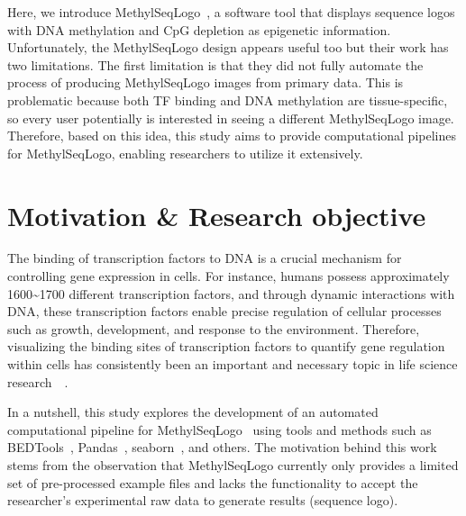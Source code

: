 \documentclass{PHlab-thesis}
\begin{document}
Here, we introduce MethylSeqLogo~\cite{Hsu2022.11.05.515271}, a software tool that displays sequence logos with DNA methylation and CpG depletion as epigenetic information. Unfortunately, the MethylSeqLogo design appears useful too but their work has two limitations. The first limitation is that they did not fully automate the process of producing MethylSeqLogo images from primary data. This is problematic because both TF binding and DNA methylation are tissue-specific, so every user potentially is interested in seeing a different MethylSeqLogo image. Therefore, based on this idea, this study aims to provide computational pipelines for MethylSeqLogo, enabling researchers to utilize it extensively.
\section{Motivation \& Research objective}
The binding of transcription factors to DNA is a crucial mechanism for controlling gene expression in cells. For instance, humans possess approximately 1600\textasciitilde1700 different transcription factors, and through dynamic interactions with DNA, these transcription factors enable precise regulation of cellular processes such as growth, development, and response to the environment. Therefore, visualizing the binding sites of transcription factors to quantify gene regulation within cells has consistently been an important and necessary topic in life science research~\cite{vaquerizas2009census}~\cite{liu2017transcriptional}.

In a nutshell, this study explores the development of an automated computational pipeline for MethylSeqLogo~\cite{Hsu2022.11.05.515271} using tools and methods such as BEDTools~\cite{10.1093/bioinformatics/btq033}, Pandas~\cite{mckinney2010data}, seaborn~\cite{Waskom2021}, and others. The motivation behind this work stems from the observation that MethylSeqLogo currently only provides a limited set of pre-processed example files and lacks the functionality to accept the researcher's experimental raw data to generate results (sequence logo).
\end{document}
